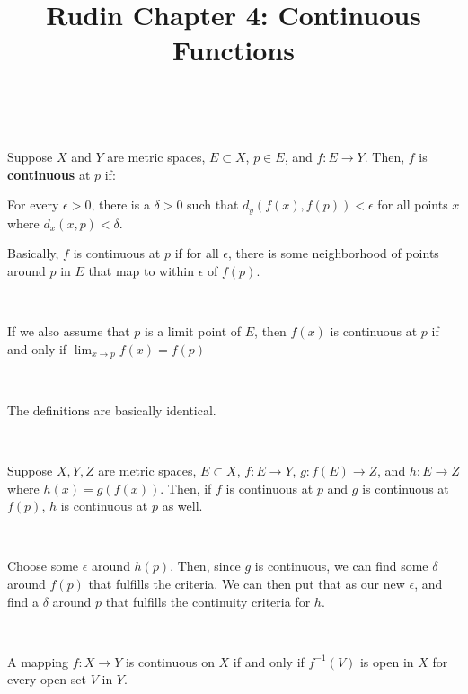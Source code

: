 \documentclass{article}
\title{Rudin Chapter 4: Continuous Functions}
\begin{document}
\maketitle

\begin{definition}[Continuity]
\

Suppose $X$ and $Y$ are metric spaces, $E \subset X$, $p \in E$, and $f: E \to Y$. Then, $f$ is \textbf{continuous} at $p$ if:

For every $\epsilon > 0$, there is a $\delta > 0$ such that $d_y(f(x), f(p)) < \epsilon$ for all points $x$ where $d_x(x, p) < \delta$.

Basically, $f$ is continuous at $p$ if for all $\epsilon$, there is some neighborhood of points around $p$ in $E$ that map to within $\epsilon$ of $f(p)$.
\end{definition}

\begin{theorem}
\

If we also assume that $p$ is a limit point of $E$, then $f(x)$ is continuous at $p$ if and only if $\lim_{x \to p} f(x) = f(p)$
\end{theorem}

\begin{customproof}
\

The definitions are basically identical. 
\end{customproof}

\begin{theorem}
\

Suppose $X,Y,Z$ are metric spaces, $E \subset X$, $f: E \to Y$, $g: f(E) \to Z$, and $h: E \to Z$ where $h(x) = g(f(x))$. Then, if $f$ is continuous at $p$ and $g$ is continuous at $f(p)$, $h$ is continuous at $p$ as well.
\end{theorem}

\begin{customproof}
\

Choose some $\epsilon$ around $h(p)$. Then, since $g$ is continuous, we can find some $\delta$ around $f(p)$ that fulfills the criteria. We can then put that as our new $\epsilon$, and find a $\delta$ around $p$ that fulfills the continuity criteria for $h$.
\end{customproof}

\begin{theorem}
\

A mapping $f: X \to Y$ is continuous on $X$ if and only if $f ^{-1} (V)$ is open in $X$ for every open set $V$ in $Y$.
\end{theorem}
\end{document}

